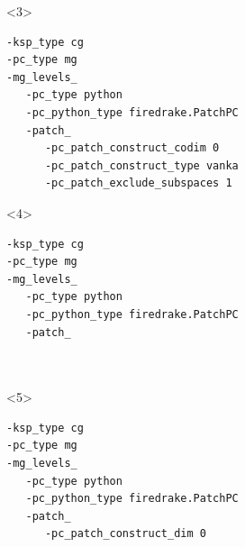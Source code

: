 \documentclass[presentation,aspectratio=43, 10pt]{beamer}
\begin{document}
\begin{frame}[fragile, t]
\begin{onlyenv}
\begin{columns}
\begin{column}{0.6\textwidth}
\begin{onlyenv}
\begin{verbatim}
\end{verbatim}
        \end{onlyenv}
        \begin{onlyenv}<3>
\begin{verbatim}
-ksp_type cg
-pc_type mg
-mg_levels_
   -pc_type python
   -pc_python_type firedrake.PatchPC
   -patch_
      -pc_patch_construct_codim 0
      -pc_patch_construct_type vanka
      -pc_patch_exclude_subspaces 1
\end{verbatim}
        \end{onlyenv}
        \begin{onlyenv}<4>
\begin{verbatim}
-ksp_type cg
-pc_type mg
-mg_levels_
   -pc_type python
   -pc_python_type firedrake.PatchPC
   -patch_



\end{verbatim}
        \end{onlyenv}
        \begin{onlyenv}<5>
\begin{verbatim}
-ksp_type cg
-pc_type mg
-mg_levels_
   -pc_type python
   -pc_python_type firedrake.PatchPC
   -patch_
      -pc_patch_construct_dim 0



\end{verbatim}
\end{onlyenv}
\end{column}
\end{columns}
\end{onlyenv}
\end{frame}
\end{document}
